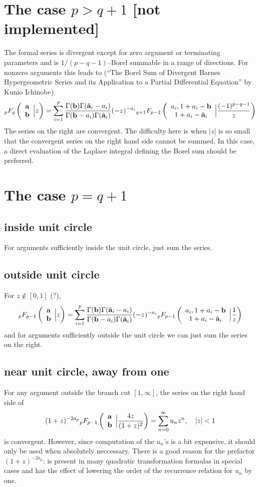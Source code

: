 \documentclass[10pt]{article}
\numberwithin{equation}{section}
\newcommand{\F}[5] {{}_{#1}F_{#2} \left( \begin{array}{c} #3 \\ #4 \end{array} \Big| #5  \right)}
\begin{document}
\section{The case $p > q+1$ [not implemented]}
The formal series is divergent except for zero argument or terminating parameters and is $1/(p-q-1)$--Borel summable in a range of directions. For nonzero arguments this leads to (``The Borel Sum of Divergent Barnes Hypergeometric Series and its Application to a Partial Differential Equation'' by Kunio Ichinobe)
\begin{equation*}
\F{p}{q}{\bold{a}}{\bold{b}}{z} = \sum_{i=1}^{p} \frac{\Gamma(\bold{b}) \Gamma(\hat{\bold{a}}_i-a_i)}{\Gamma(\bold{b}-a_i) \Gamma(\hat{\bold{a}}_i)} (-z)^{-a_i} \F{q+1}{p-1}{a_i,1+a_i-\bold{b}}{1+a_i-\hat{\bold{a}}_i}{\frac{(-1)^{p-q-1}}{z}}
\end{equation*}
The series on the right are convergent. The difficulty here is when $|z|$ is so small that the convergent series on the right hand side cannot be summed. In this case, a direct evaluation of the Laplace integral defining the Borel sum should be preferred.

\section{The case $p=q+1$}

\subsection{inside unit circle}
For arguments sufficiently inside the unit circle, just sum the series.

\subsection{outside unit circle}
For $z \not \in [0,1]$ (?),
\begin{equation*}
\F{p}{p-1}{\bold{a}}{\bold{b}}{z} = \sum_{i=1}^{p} \frac{\Gamma(\bold{b}) \Gamma(\hat{\bold{a}}_i-a_i)}{\Gamma(\bold{b}-a_i) \Gamma(\hat{\bold{a}}_i)} (-z)^{-a_i} \F{p}{p-1}{a_i,1+a_i-\bold{b}}{1+a_i-\hat{\bold{a}}_i}{\frac{1}{z}}
\end{equation*}
and for arguments sufficiently outside the unit circle we can just sum the series on the right.

\subsection{near unit circle, away from one}
For any argument outside the branch cut $[1,\infty]$, the series on the right hand side of
\begin{equation*}
(1+z)^{-2 a_p} \F{p}{p-1}{\bold{a}}{\bold{b}}{\frac{4 z}{(1+z)^2}} = \sum_{n=0}^{\infty}u_n z^n, \quad |z| < 1
\end{equation*}
is convergent. However, since computation of the $u_n$'s is a bit expensive, it should only be used when absolutely neccessary. There is a good reason for the prefactor $(1+z)^{-2a_p}$: is present in many quadratic transformation formulas in special cases and has the effect of lowering the order of the recurrence relation for $u_n$ by one.
\end{document}
